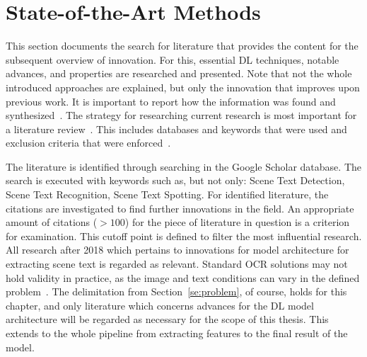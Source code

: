\section{State-of-the-Art Methods}\label{se:innovations}
This section documents the search for literature that provides the content for the subsequent
overview of innovation.
For this, essential \ac{DL} techniques, notable advances, and properties are researched
and presented.
Note that not the whole introduced approaches are explained, but only the innovation that
improves upon previous work.
It is important to report how the information was found and
synthesized~\citep{torraco_writing_2005}.
The strategy for researching current research is most important for a literature
review~\citep{snyder_literature_2019}.
This includes databases and keywords that were used and exclusion criteria that were
enforced~\citep{torraco_writing_2005}.

The literature is identified through searching in the Google Scholar database.
The search is executed with keywords such as, but not only: Scene Text Detection,
Scene Text Recognition, Scene Text Spotting.
For identified literature, the citations are investigated to find further innovations in the field.
An appropriate amount of citations ($>100$) for the piece of literature in question is a
criterion for examination.
This cutoff point is defined to filter the most influential research.
All research after 2018 which pertains to innovations for model architecture for extracting scene
text is regarded as relevant.
Standard \ac{OCR} solutions may not hold validity in practice, as the image and text conditions can
vary in the defined problem~\citep{chen_text_2021}.
The delimitation from Section~\ref{se:problem}, of course, holds for this chapter, and only literature
which concerns advances for the \ac{DL} model architecture will be regarded as necessary for the
scope of this thesis.
This extends to the whole pipeline from extracting features to the final result of the model.

